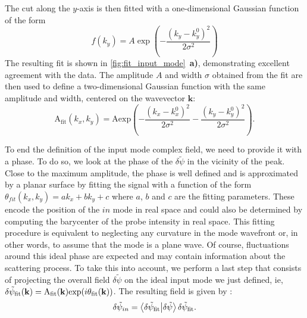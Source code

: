 The cut along the \( y \)-axis is then fitted with a one-dimensional Gaussian function of the form
\[
f(k_y) = A \exp\left( -\frac{(k_y - k_y^0)^2}{2\sigma^2} \right)
\]
The resulting fit is shown in \autoref{fig:fit_input_mode}~\textbf{a)}, demonstrating excellent agreement with the data. The amplitude \( A \) and width \( \sigma \) obtained from the fit are then used to define a two-dimensional Gaussian function with the same amplitude and width, centered on the wavevector \( \mathbf{k} \):
\begin{equation}
    \mathrm{A_{fit}}(k_x,k_y) = \mathrm{A} \mathrm{exp}(-\frac{(k_x-k_x^0)^2}{2\sigma^2}-\frac{(k_y-k_y^0)^2}{2\sigma^2}).
    \label{eq:gaussian_amp} 
\end{equation}

To end the definition of the input mode complex field, we need to provide it with a phase. To do so, we look at the phase of the $\delta \tilde{\psi}$ 
in the vicinity of the peak. Close to the maximum amplitude, the phase is well defined and is approximated by a planar surface by fitting the signal with a function of the form $\theta_{fit}(k_x, k_y)=ak_x+bk_y+c$ where $a$, $b$ and $c$ are the fitting parameters.
These encode the position of the $in$ mode in real space and could also be determined by computing the barycenter of the probe intensity in real space.
This fitting procedure is equivalent to neglecting any curvature in the mode wavefront or, in other words, to assume that the mode is a plane wave.
Of course, fluctuations around this ideal phase are expected and may contain information about the scattering process.
To take this into account, we perform a last step that consists of projecting the overall field $\delta \tilde{\psi}$ on the ideal input mode we just defined, ie, $\delta \tilde{\psi}_{\mathrm{fit}}(\mathbf{k})= \mathrm{A_{fit}}(\mathbf{k})\mathrm{exp}(i\theta_{\mathrm{fit}}(\mathbf{k}))$.
The resulting field is given by :
\begin{equation}
    \delta \tilde{\psi}_{in} = \bra{\delta \tilde{\psi}_{\mathrm{fit}}}\ket{\delta \tilde{\psi}} \delta \tilde{\psi}_{\mathrm{fit}}. 
    \label{eq:input_mode_scalar_product}
\end{equation}

\bigskip 

